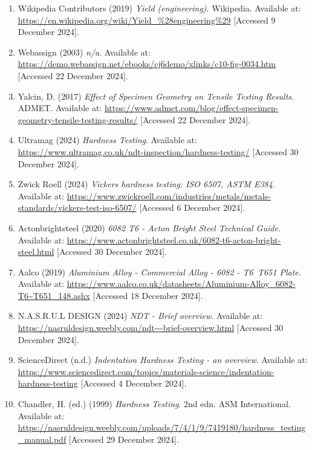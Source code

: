 \documentclass{article}
\begin{document}
{\begin{enumerate}
    \item Wikipedia Contributors (2019) \textit{Yield (engineering)}. Wikipedia. Available at: \url{https://en.wikipedia.org/wiki/Yield_\%28engineering\%29} [Accessed 9 December 2024].
    
    \item Webassign (2003) \textit{n/a}. Available at: \url{https://demo.webassign.net/ebooks/cj6demo/xlinks/c10-fig-0034.htm} [Accessed 22 December 2024].
    
    \item Yalcin, D. (2017) \textit{Effect of Specimen Geometry on Tensile Testing Results}. ADMET. Available at: \url{https://www.admet.com/blog/effect-specimen-geometry-tensile-testing-results/} [Accessed 22 December 2024].
    
    \item Ultramag (2024) \textit{Hardness Testing}. Available at: \url{https://www.ultramag.co.uk/ndt-inspection/hardness-testing/} [Accessed 30 December 2024].
    
    \item Zwick Roell (2024) \textit{Vickers hardness testing: ISO 6507, ASTM E384}. Available at: \url{https://www.zwickroell.com/industries/metals/metals-standards/vickers-test-iso-6507/} [Accessed 6 December 2024].
    
    \item Actonbrightsteel (2020) \textit{6082 T6 - Acton Bright Steel Technical Guide}. Available at: \url{https://www.actonbrightsteel.co.uk/6082-t6-acton-bright-steel.html} [Accessed 30 December 2024].
    
    \item Aalco (2019) \textit{Aluminium Alloy - Commercial Alloy - 6082 - T6~T651 Plate}. Available at: \url{https://www.aalco.co.uk/datasheets/Aluminium-Alloy_6082-T6~T651_148.ashx} [Accessed 18 December 2024].
    
    \item N.A.S.R.U.L DESIGN (2024) \textit{NDT - Brief overview}. Available at: \url{https://nasruldesign.weebly.com/ndt---brief-overview.html} [Accessed 30 December 2024].
    
    \item ScienceDirect (n.d.) \textit{Indentation Hardness Testing - an overview}. Available at: \url{https://www.sciencedirect.com/topics/materials-science/indentation-hardness-testing} [Accessed 4 December 2024].
    
    \item Chandler, H. (ed.) (1999) \textit{Hardness Testing}. 2nd edn. ASM International. Available at: \url{https://nasruldesign.weebly.com/uploads/7/4/1/9/7419180/hardness_testing_manual.pdf} [Accessed 29 December 2024].
\end{enumerate}


}
\end{document}
